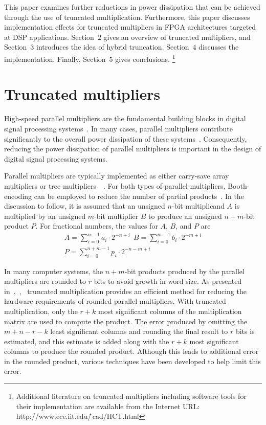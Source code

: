 This paper examines further reductions in power dissipation that can be achieved
through the use of truncated multiplication.
Furthermore, this paper discusses implementation effects for truncated
multipliers in FPGA architectures targeted at DSP applications.
Section~$2$ gives an overview
of truncated multipliers, and Section~$3$ introduces the idea of hybrid
truncation.   Section~$4$ discusses the implementation. 
Finally, Section~$5$ gives conclusions. 
\footnote{Additional literature on truncated multipliers including 
software tools for their implementation 
are available from the Internet URL:
http://www.ece.iit.edu/\~\,cad/HCT.html}


\section{Truncated multipliers}

High-speed parallel multipliers are the fundamental building blocks in
digital signal processing systems~\cite{ma}. 
In many cases, 
parallel multipliers contribute 
significantly to the overall power dissipation of 
these systems~\cite{parhi}.
Consequently, reducing the power 
dissipation of parallel multipliers is important
in the design of digital signal processing systems. 

Parallel multipliers are typically implemented as either carry-save
array 
multipliers or 
tree multipliers~~\cite{bickerstaff2}. 
For both
types of parallel multipliers, Booth-encoding can be employed 
to reduce the number of 
partial products~\cite{booth}. 
In the discussion to follow, it is assumed that an unsigned $n$-bit 
multiplicand $A$ is multiplied by an unsigned $m$-bit multiplier $B$
to produce an unsigned $n+m$-bit product $P$. For fractional numbers, 
the values for $A$, $B$, and $P$ are
\begin{eqnarray}
A = \sum_{i=0}^{n-1} a_{i} \cdot 2^{-n+i} ~~
B = \sum_{i=0}^{m-1} b_{i} \cdot 2^{-m+i} \nonumber \\
P  = \sum_{i=0}^{n+m-1} p_{i} \cdot 2^{-n-m+i} 
\end{eqnarray}

In many computer systems, the $n+m$-bit products produced by the
parallel multipliers are rounded to $r$ bits to avoid growth in 
word size. As presented 
in~\cite{lim},~\cite{schulte},~\cite{king}
truncated multiplication provides an efficient 
method for reducing the hardware requirements of rounded parallel multipliers. 
With truncated multiplication, only the $r+k$ most significant columns
of the multiplication matrix are used to compute the product. The
error produced by omitting the $m+n-r-k$ least significant columns 
and rounding the final result to $r$ bits is estimated, and this 
estimate is added along with the $r+k$ most significant columns to 
produce the rounded product. Although this leads to additional error 
in the rounded product, various techniques have been developed to help 
limit this error. 

